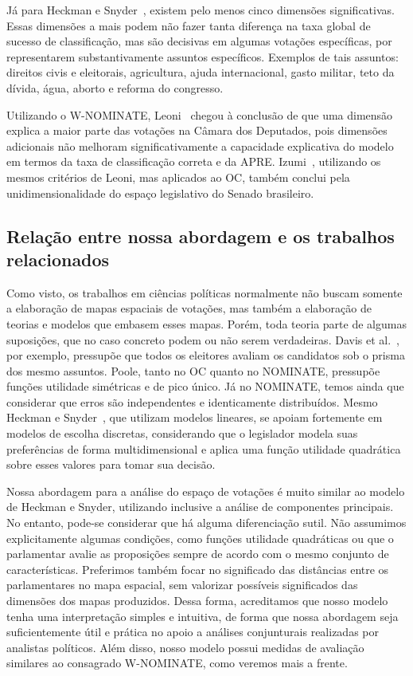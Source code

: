 \documentclass[a4paper, 12pt]{article}
\newcommand\nominate{NOMINATE\xspace}
\newcommand\wnominate{W-NOMINATE\xspace}
\begin{document}
Já para Heckman e Snyder~\cite{heckman-snyder1997}, existem pelo menos cinco dimensões significativas. Essas dimensões a mais podem não fazer tanta diferença na taxa global de sucesso de classificação, mas são decisivas em algumas votações específicas, por representarem substantivamente assuntos específicos. Exemplos de tais assuntos: direitos civis e eleitorais, agricultura, ajuda internacional, gasto militar, teto da dívida, água, aborto e reforma do congresso.

Utilizando o W-NOMINATE, Leoni~\cite{leoni02cdep} chegou à conclusão de que uma dimensão explica a maior parte das votações na Câmara dos Deputados, pois dimensões adicionais não melhoram significativamente a capacidade explicativa do modelo em termos da taxa de classificação correta e da APRE. Izumi~\cite{izumi2016senado}, utilizando os mesmos critérios de Leoni, mas aplicados ao OC, também conclui pela unidimensionalidade do espaço legislativo do Senado brasileiro.


\subsection{Relação entre nossa abordagem e os trabalhos relacionados}

Como visto, os trabalhos em ciências políticas normalmente não buscam somente a elaboração de mapas espaciais de votações, mas também a elaboração de teorias e modelos que embasem esses mapas. Porém, toda teoria parte de algumas suposições, que no caso concreto podem ou não serem verdadeiras. Davis et al.~\cite{davis1970electoral}, por exemplo, pressupõe que todos os eleitores avaliam os candidatos sob o prisma dos mesmo assuntos. Poole, tanto no OC quanto no \nominate, pressupõe funções utilidade simétricas e de pico único. Já no \nominate, temos ainda que considerar que erros são independentes e identicamente distribuídos. Mesmo Heckman e Snyder~\cite{heckman-snyder1997}, que utilizam modelos lineares, se apoiam fortemente em modelos de escolha discretas, considerando que o legislador modela suas preferências de forma multidimensional e aplica uma função utilidade quadrática sobre esses valores para tomar sua decisão.

Nossa abordagem para a análise do espaço de votações é muito similar ao modelo de Heckman e Snyder, utilizando inclusive a análise de componentes principais. No entanto, pode-se considerar que há alguma diferenciação sutil. Não assumimos explicitamente algumas condições, como funções utilidade quadráticas ou que o parlamentar avalie as proposições sempre de acordo com o mesmo conjunto de características. Preferimos também focar no significado das distâncias entre os parlamentares no mapa espacial, sem valorizar possíveis significados das dimensões dos mapas produzidos. Dessa forma, acreditamos que nosso modelo tenha uma interpretação simples e intuitiva, de forma que nossa abordagem seja suficientemente útil e prática no apoio a análises conjunturais realizadas por analistas políticos. Além disso, nosso modelo possui medidas de avaliação similares ao consagrado \wnominate, como veremos mais a frente.
\end{document}
